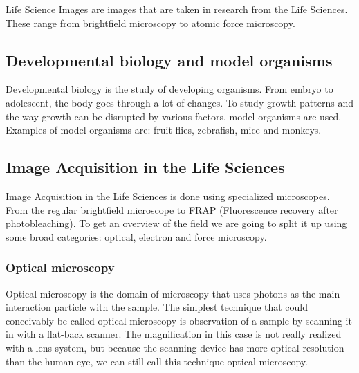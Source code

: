 Life Science Images are images that
are taken in research from the Life Sciences. These range from
brightfield microscopy to atomic force
microscopy.


\subsection{Developmental biology and model organisms}

Developmental biology is the study
of developing organisms. From embryo to
adolescent, the body goes through a lot
of changes. To study growth patterns and the way growth can be
disrupted by various factors, model organisms are used. Examples of model organisms are: fruit
flies, zebrafish, mice and monkeys.


\subsection{Image Acquisition in the Life Sciences}

Image Acquisition in the Life Sciences
is done using specialized microscopes. From the regular brightfield
microscope to FRAP (Fluorescence
recovery after photobleaching). To get an overview of the
field we are going to split it up using some broad categories:
optical, electron and force microscopy.

\subsubsection{Optical microscopy}

Optical microscopy is the domain of microscopy that uses photons as
the main interaction particle with the sample. The simplest technique
that could conceivably be called optical microscopy is observation of
a sample by scanning it in with a flat-back scanner. The magnification
in this case is not really realized with a lens system, but because
the scanning device has more optical resolution than the human eye, we
can still call this technique optical microscopy.

